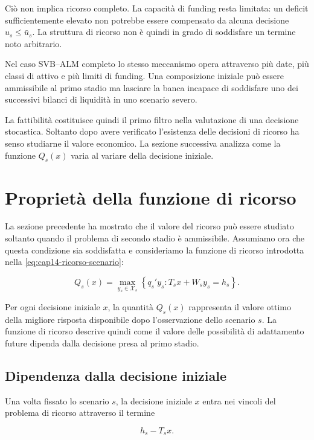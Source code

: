 Ci\`o non implica ricorso completo. La capacit\`a di funding resta limitata:
un deficit sufficientemente elevato non potrebbe essere compensato da alcuna
decisione $u_s\leq\bar u_s$. La struttura di ricorso non \`e quindi in grado
di soddisfare un termine noto arbitrario.

Nel caso SVB--ALM completo lo stesso meccanismo opera attraverso pi\`u date,
pi\`u classi di attivo e pi\`u limiti di funding. Una composizione iniziale
pu\`o essere ammissibile al primo stadio ma lasciare la banca incapace di
soddisfare uno dei successivi bilanci di liquidit\`a in uno scenario severo.

La fattibilit\`a costituisce quindi il primo filtro nella valutazione di una
decisione stocastica. Soltanto dopo avere verificato l'esistenza delle
decisioni di ricorso ha senso studiarne il valore economico. La sezione
successiva analizza come la funzione $Q_s(x)$ varia al variare della decisione
iniziale.

\section{Propriet\`a della funzione di ricorso}

\label{sec:cap15-proprieta-funzione-ricorso-v2}

La sezione precedente ha mostrato che il valore del ricorso pu\`o essere
studiato soltanto quando il problema di secondo stadio \`e ammissibile.
Assumiamo ora che questa condizione sia soddisfatta e consideriamo la funzione
di ricorso introdotta nella
\eqref{eq:cap14-ricorso-scenario}:

\[
Q_s(x)
=
\max_{y_s\in\mathcal X_s}
\left\{
q_s'y_s:
T_sx+W_sy_s=h_s
\right\}.
\]

Per ogni decisione iniziale $x$, la quantit\`a $Q_s(x)$ rappresenta il valore
ottimo della migliore risposta disponibile dopo l'osservazione dello
scenario $s$. La funzione di ricorso descrive quindi come il valore delle
possibilit\`a di adattamento future dipenda dalla decisione presa al primo
stadio.

\subsection{Dipendenza dalla decisione iniziale}

Una volta fissato lo scenario $s$, la decisione iniziale $x$ entra nei vincoli
del problema di ricorso attraverso il termine

\[
h_s-T_sx.
\]

